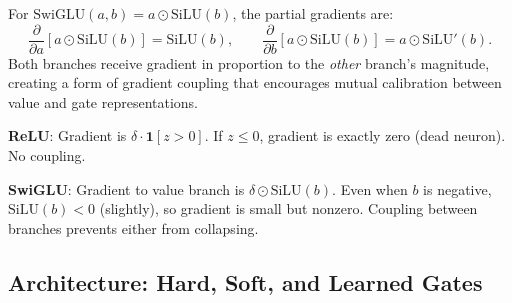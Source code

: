 \documentclass[12pt,a4paper]{article}
\theoremstyle{definition}
\theoremstyle{remark}
\begin{document}
For $\mathrm{SwiGLU}(a,b) = a \odot \mathrm{SiLU}(b)$, the partial gradients are:
\[
\frac{\partial}{\partial a}\left[a \odot \mathrm{SiLU}(b)\right] = \mathrm{SiLU}(b), \qquad
\frac{\partial}{\partial b}\left[a \odot \mathrm{SiLU}(b)\right] = a \odot \mathrm{SiLU}'(b).
\]
Both branches receive gradient in proportion to the \emph{other} branch's magnitude, creating a form of gradient coupling that encourages mutual calibration between value and gate representations.

\begin{extbox}
\textbf{ReLU}: Gradient is $\delta \cdot \mathbf{1}[z>0]$. If $z \le 0$, gradient is exactly zero (dead neuron). No coupling.

\textbf{SwiGLU}: Gradient to value branch is $\delta \odot \mathrm{SiLU}(b)$. Even when $b$ is negative, $\mathrm{SiLU}(b) < 0$ (slightly), so gradient is small but nonzero. Coupling between branches prevents either from collapsing.
\end{extbox}

\subsection{Architecture: Hard, Soft, and Learned Gates}
\end{document}
